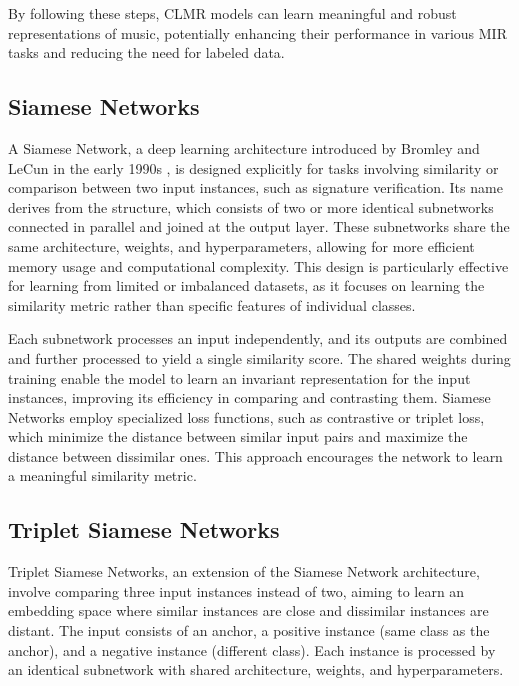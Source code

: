 By following these steps, CLMR models can learn meaningful and robust representations of music, potentially enhancing their performance in various MIR tasks and reducing the need for labeled data.

\subsection{Siamese Networks}

A Siamese Network, a deep learning architecture introduced by Bromley and LeCun in the early 1990s \cite{Bromley1993SignatureNetwork}, is designed explicitly for tasks involving similarity or comparison between two input instances, such as signature verification. Its name derives from the structure, which consists of two or more identical subnetworks connected in parallel and joined at the output layer. These subnetworks share the same architecture, weights, and hyperparameters, allowing for more efficient memory usage and computational complexity. This design is particularly effective for learning from limited or imbalanced datasets, as it focuses on learning the similarity metric rather than specific features of individual classes.

Each subnetwork processes an input independently, and its outputs are combined and further processed to yield a single similarity score. The shared weights during training enable the model to learn an invariant representation for the input instances, improving its efficiency in comparing and contrasting them. Siamese Networks employ specialized loss functions, such as contrastive or triplet loss, which minimize the distance between similar input pairs and maximize the distance between dissimilar ones. This approach encourages the network to learn a meaningful similarity metric.


\subsection{Triplet Siamese Networks}


Triplet Siamese Networks, an extension of the Siamese Network architecture, involve comparing three input instances instead of two, aiming to learn an embedding space where similar instances are close and dissimilar instances are distant. The input consists of an anchor, a positive instance (same class as the anchor), and a negative instance (different class). Each instance is processed by an identical subnetwork with shared architecture, weights, and hyperparameters.

